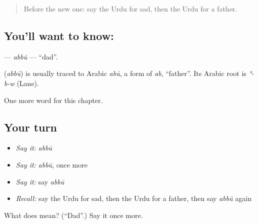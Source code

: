 \begin{quote}
Before the new one: say the Urdu for sad, then the Urdu for a father.
\end{quote}

\subsection*{You'll want to know: }
\textbf{} — \emph{abbū} — \textquotedblleft{}dad\textquotedblright{}.

\begin{cousinweb}
\textbf{} (\emph{abbū}) is usually traced to Arabic \emph{abū}, a form of \emph{ab}, \textquotedblleft{}father\textquotedblright{}. Its Arabic root is \emph{ʾ-b-w} (Lane).
\end{cousinweb}

\begin{grammarlens}[title={What you've built}]
One more word for this chapter.
\end{grammarlens}

\subsection*{Your turn}
\begin{itemize}
\raggedright
  \item \emph{Say it:} \emph{abbū}
  \item \emph{Say it:} \emph{abbū}, once more
  \item \emph{Say it:} say \emph{abbū}
  \item \emph{Recall:} say the Urdu for sad, then the Urdu for a father, then say \emph{abbū} again
\end{itemize}

\begin{tcolorbox}[breakable,colback=teal!4,colframe=teal!35!black,title={Before you move on}]
What does  mean? (\textquotedblleft{}Dad\textquotedblright{}.) Say it once more.
\end{tcolorbox}
